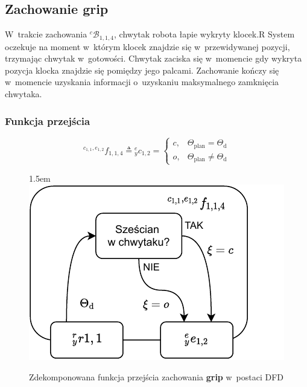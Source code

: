 
\subsection{Zachowanie grip}
\label{subsec:cs-grip}
W~trakcie zachowania ${}^{c}\mathcal{B}_{1,1,4}$, chwytak robota łapie wykryty klocek.R
System oczekuje na moment w~którym klocek znajdzie się w~przewidywanej pozycji, trzymając chwytak w~gotowości. Chwytak zaciska się w~momencie gdy wykryta pozycja klocka znajdzie się pomiędzy jego palcami. Zachowanie kończy się w~momencie uzyskania informacji o~uzyskaniu maksymalnego zamknięcia chwytaka.

\subsubsection{Funkcja przejścia}
\begin{equation}
    {}^{c_{1,1}, e_{1,2}}f_{1,1,4} \triangleq {}^{e}_{y}c_{1,2} = \begin{cases}
        c, & \Theta_{\mathrm{plan}} = \Theta_{\mathrm{d}}\\
        o, & \Theta_{\mathrm{plan}} \neq \Theta_{\mathrm{d}}
    \end{cases}
\end{equation}

\begin{figure}[ht]
    \leftskip1.5em
    \includegraphics[width=\columnwidth]{figures/ISR-cs-fp-grip.pdf}
    \caption{Zdekomponowana funkcja przejścia zachowania \textbf{grip} w~postaci DFD}
    \label{fig:cs-fp-grip}
\end{figure}

